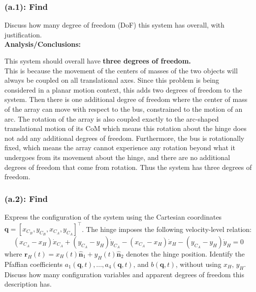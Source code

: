 \documentclass[titlepage]{article}
\begin{document}
\subsubsection*{(a.1): Find}
Discuss how many degree of freedom (DoF) this system has overall, with justification.\\

\textbf{Analysis/Conclusions:}
\begin{mdframed}[linewidth=1pt, innertopmargin=10pt, innerbottommargin=10pt]
	This system should overall have \textbf{three degrees of freedom.}\\
	
	This is because the movement of the centers of masses of the two objects will always be coupled on all translational axes. Since this problem is being considered in a planar motion context, this adds two degrees of freedom to the system. Then there is one additional degree of freedom where the center of mass of the array can move with respect to the bus, constrained to the motion of an arc. The rotation of the array is also coupled exactly to the arc-shaped translational motion of its CoM which means this rotation about the hinge does not add any additional degrees of freedom. Furthermore, the bus is rotationally fixed, which means the array cannot experience any rotation beyond what it undergoes from its movement about the hinge, and there are no additional degrees of freedom that come from rotation. Thus the system has three degrees of freedom.
\end{mdframed}

\subsubsection*{(a.2): Find}
Express the configuration of the system using the Cartesian coordinates $\boldsymbol{q}=[x_{C_B},y_{C_B},x_{C_A},y_{C_A}]^\top$. The hinge imposes the following velocity-level relation:
\begin{equation}
	(x_{C_A}-x_H)\dot{x}_{C_A}+(y_{C_A}-y_H)\dot{y}_{C_A}-(x_{C_A}-x_H)\dot{x}_H-(y_{C_A}-y_H)\dot{y}_H=0
	\label{eq:a2setup}
\end{equation}
where $\boldsymbol{r}_H(t)=x_H(t)\hat{\boldsymbol{n}}_1+y_H(t)\hat{\boldsymbol{n}}_2$ denotes the hinge position. Identify the Pfaffian coefficients $a_1(\boldsymbol{q},t),...,a_4(\boldsymbol{q},t)$, and $b(\boldsymbol{q},t)$, without using $x_H$, $y_H$. Discuss how many configuration variables and apparent degrees of freedom this description has.\\
\end{document}
